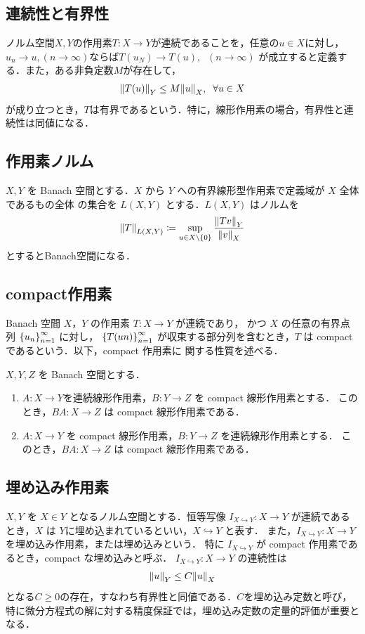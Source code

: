 \subsection{連続性と有界性}
ノルム空間\(X,Y\)の作用素\(T : X \rightarrow Y\)が連続であることを，任意の\(u\in X\)に対し，
\(u_n\rightarrow u,(n\rightarrow \infty)\)ならば\(T(u_N)\rightarrow T(u),\;\;(n\rightarrow \infty)\)
が成立すると定義する．また，ある非負定数\(M\)が存在して，
\begin{align}
    \norm{T(u)}_Y \leq M \norm{u}_X,\;\; \forall u\in X
\end{align}
が成り立つとき，\(T\)は有界であるという．特に，線形作用素の場合，有界性と連続性は同値になる．
\subsection{作用素ノルム}
\(X, Y\) を Banach 空間とする．\(X\) から \(Y\) への有界線形型作用素で定義域が \(X\) 全体であるもの全体
の集合を \(L(X, Y )\) とする．\(L(X, Y )\) はノルムを
\begin{align}
    \norm{T}_{L(X,Y)} \coloneqq \sup\limits_{u \in X \backslash \{ 0 \} }\dfrac{\norm{Tv}_Y}{\norm{v}_X}
\end{align}
とするとBanach空間になる．
\subsection{compact作用素}
Banach 空間 \(X\)，\(Y\) の作用素 \(T : X \rightarrow Y\) が連続であり，
かつ \(X\) の任意の有界点列 \(\qty{u_n}^\infty_{n=1}\) に対し，
\(\qty{T(un)}^\infty_{n=1}\) が収束する部分列を含むとき，\(T\) は compact であるという．以下，compact 作用素に
関する性質を述べる．
\begin{定理} 
    \(X,Y,Z\) を Banach 空間とする．
    \begin{enumerate}[(1)]
        \item \( A:X\rightarrow Y \)を連続線形作用素，\(B:Y\rightarrow Z\) を compact 線形作用素とする．
        このとき，\(BA:X\rightarrow Z\) は compact 線形作用素である．
        \item \(A:X\rightarrow Y\) を compact 線形作用素，\(B:Y\rightarrow Z\) を連続線形作用素とする． 
        このとき，\(BA:X\rightarrow Z\) は compact 線形作用素である．
    \end{enumerate}
\end{定理}

\subsection{埋め込み作用素}
\(X,Y\) を \(X \in Y\) となるノルム空間とする．恒等写像 \(I_{X \hookrightarrow Y}:X \rightarrow Y \) 
が連続であるとき，\(X\) は \(Y\)に埋め込まれているといい，\(X \hookrightarrow Y\) と表す．
また，\(I_{X \hookrightarrow Y}:X \rightarrow Y \) を埋め込み作用素，または埋め込みという．
特に \(I_{X \hookrightarrow Y}\) が compact 作用素であるとき，compact な埋め込みと呼ぶ．
\(I_{X \hookrightarrow Y}:X \rightarrow Y \) の連続性は
\begin{align}
    \norm{u}_Y \leq C\norm{u}_X
\end{align}
となる\(C \geq 0\)の存在，すなわち有界性と同値である．\(C\)を埋め込み定数と呼び，
特に微分方程式の解に対する精度保証では，埋め込み定数の定量的評価が重要となる．
